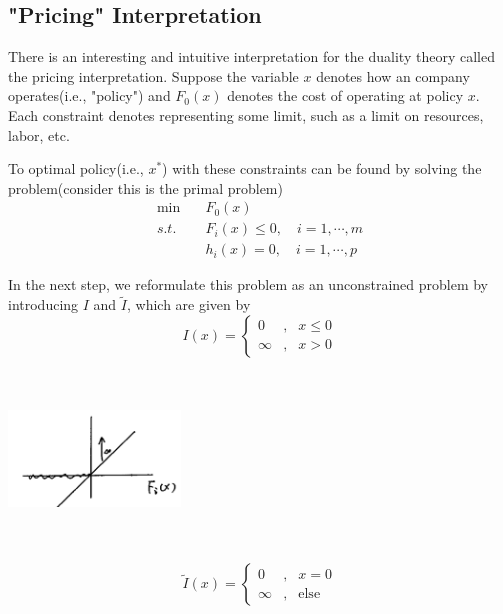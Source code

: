 \vspace{0.3cm}
\subsection{"Pricing" Interpretation}
There is an interesting and intuitive interpretation for the duality theory called the pricing interpretation. Suppose the variable $x$ denotes how an company operates(i.e., "policy") and $F_0(x)$ denotes the cost of operating at policy $x$. Each constraint denotes representing some limit, such as a limit on resources, labor, etc. 

To optimal policy(i.e., $x^*$) with these constraints can be found by solving the problem(consider this is the primal problem)
\begin{align*}
	\min \quad & F_0(x)\\
	s.t.\quad & F_i(x) \leq 0,\quad i = 1,\cdots,m\\
	& h_i(x) = 0,\quad i = 1,\cdots,p
\end{align*}

In the next step, we reformulate this problem as an unconstrained problem by introducing $I$ and $\tilde{I}$, which are given by
\begin{equation}
I(x)=\left\{
\begin{aligned}
0 & , & x\leq 0 \\
\infty & , & x>0
\end{aligned}
\right.
\end{equation}

\begin{marginfigure}
	\centering
	\includegraphics[width=1.8in,height=1.8in]{figures/ch10/figure1127_2.png}
\end{marginfigure}

\begin{equation}
\tilde{I}(x)=\left\{
\begin{aligned}
0 & , & x= 0 \\
\infty & , & \text{else}
\end{aligned}
\right.
\end{equation}


